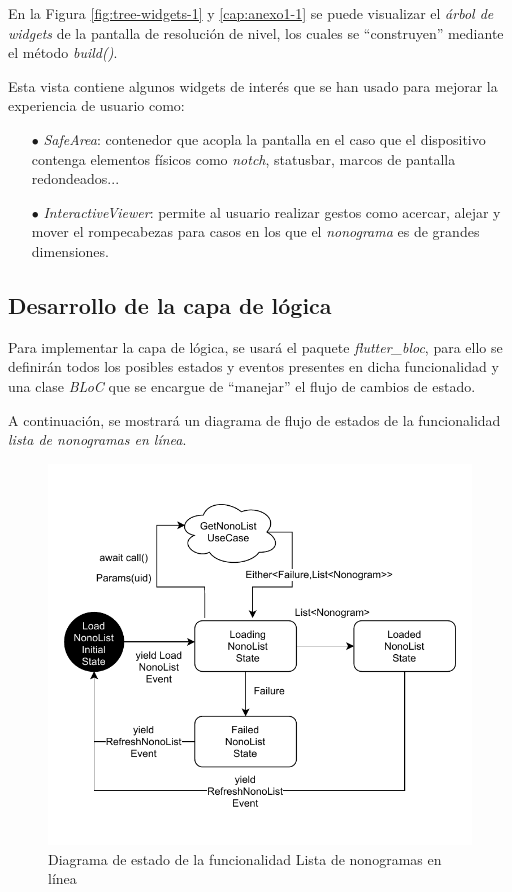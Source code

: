 En la Figura \ref{fig:tree-widgets-1} y \autoref{cap:anexo1-1} se puede visualizar el \textit{árbol de widgets} de la pantalla de resolución de nivel, los cuales
se ``construyen'' mediante el método \textit{build()}.

Esta vista contiene algunos widgets de interés que se han usado para mejorar la experiencia de usuario como:
\begin{itemize}
  \item[$\bullet$] \textit{SafeArea}: contenedor que acopla la pantalla en el caso que el dispositivo contenga elementos físicos como \textit{notch}, 
  statusbar, marcos de pantalla redondeados...
  \item[$\bullet$] \textit{InteractiveViewer}: permite al usuario realizar gestos como acercar, alejar y mover el rompecabezas 
  para casos en los que el \textit{nonograma} es de grandes dimensiones. 
\end{itemize}

\subsection{Desarrollo de la capa de lógica}
Para implementar la capa de lógica, se usará el paquete \textit{flutter\_bloc}, para ello se definirán todos los 
posibles estados y eventos presentes en dicha funcionalidad y una clase \textit{BLoC} que se encargue de 
``manejar'' el flujo de cambios de estado.

A continuación, se mostrará un diagrama de flujo de estados de la funcionalidad \textit{lista de nonogramas en línea}.

\begin{figure}[H]
  \centering
  \includegraphics[scale=0.83]{images/statesNonoList.pdf}
  \caption{Diagrama de estado de la funcionalidad Lista de nonogramas en línea}
  \label{fig:nonolist-states}
\end{figure}

